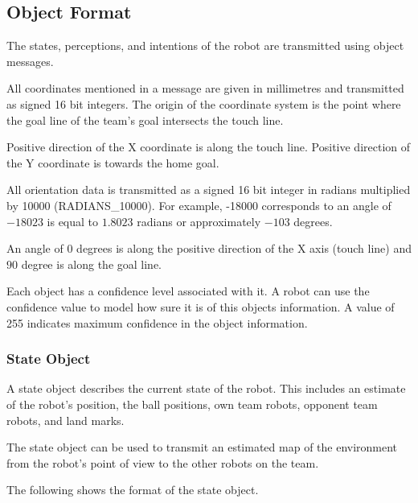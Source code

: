 \documentclass[12pt]{hurocup}
\begin{document}
\subsection*{Object Format}

The states, perceptions, and intentions of the robot are transmitted
using object messages.

All coordinates mentioned in a message are given in millimetres and
transmitted as signed 16 bit integers. The origin of the coordinate
system is the point where the goal line of the team's goal intersects
the touch line.

Positive direction of the X coordinate is along the touch
line. Positive direction of the Y coordinate is towards the home goal.

All orientation data is transmitted as a signed 16 bit integer in
radians multiplied by 10000 (RADIANS\_10000). For example, -18000
corresponds to an angle of $- 18023$ is equal to $1.8023$ radians or
approximately $-103$ degrees.

An angle of $0$ degrees is along the positive direction of the X axis
(touch line) and $90$ degree is along the goal line.

Each object has a confidence level associated with it. A robot can use
the confidence value to model how sure it is of this objects
information. A value of 255 indicates maximum confidence in the object
information.

\subsubsection*{State Object}

A state object describes the current state of the robot. This includes
an estimate of the robot's position, the ball positions, own team
robots, opponent team robots, and land marks. 

The state object can be used to transmit an estimated map of the
environment from the robot's point of view to the other robots on the
team.

The following shows the format of the state object.
\end{document}
